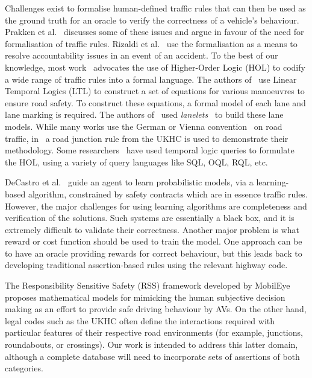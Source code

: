
Challenges exist to formalise human-defined traffic rules that can then be used as the ground truth for an oracle to verify the correctness of a vehicle's behaviour. 
%
Prakken et al.~\cite{lawabidingstudy} discusses some of these issues and argue in favour of the need for formalisation of traffic rules. Rizaldi et al.~\cite{acountability} use the formalisation as a means to resolve accountability issues in an event of an accident. To the best of our knowledge, most work~\cite{acountability, esterle, rizaldi, alves} advocates the use of Higher-Order Logic (HOL) to codify a wide range of traffic rules into a formal language. The authors of~\cite{acountability, esterle, rizaldi, alves} use Linear Temporal Logics (LTL) to construct a set of equations for various manoeuvres to ensure road safety. To construct these equations, a formal model of each lane and lane marking is required. The authors of~\cite{rizaldi} used \textit{lanelets}~\cite{lanelets2014} to build these lane models. While many works use the German or Vienna convention~\cite{vienna} on road traffic, in~\cite{alves} a road junction rule from the UKHC is used to demonstrate their methodology. Some researchers~\cite{sqlhuang, sqlgueffaz} have used temporal logic queries to formulate the HOL, using a variety of query languages like SQL, OQL, RQL, etc.  

DeCastro et al.~\cite{decastro2018counterexample} guide an agent to learn probabilistic models, via a learning-based algorithm, constrained by safety contracts which are in essence traffic rules. However, the major challenges for using learning algorithms are completeness and verification of the solutions. Such systems are essentially a black box, and it is extremely difficult to validate their correctness. Another major problem is what reward or cost function should be used to train the model. One approach can be to have an oracle providing rewards for correct behaviour, but this leads back to developing traditional assertion-based rules using the relevant highway code.

The Responsibility Sensitive Safety (RSS) framework developed by MobilEye~\cite{RSS_Shalev_Shwartz2017, RSS2_Koopman2019} proposes mathematical models for mimicking the human subjective decision making as an effort to provide safe driving behaviour by AVs. On the other hand, legal codes such as the UKHC often define the interactions required with particular features of their respective road environments (for example, junctions, roundabouts, or crossings). Our work is intended to address this latter domain, although a complete database will need to incorporate sets of assertions of both categories. 

